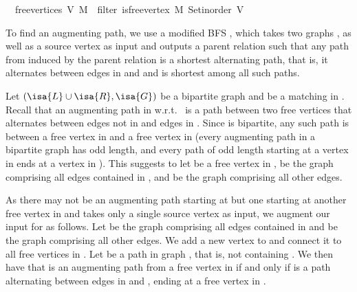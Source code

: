 \begin{isabellebody}
\ \ {\isachardoublequoteopen}free{\isacharunderscore}{\kern0pt}vertices\ V\ M\ {\isasymequiv}\ filter\ {\isacharparenleft}{\kern0pt}is{\isacharunderscore}{\kern0pt}free{\isacharunderscore}{\kern0pt}vertex\ M{\isacharparenright}{\kern0pt}\ {\isacharparenleft}{\kern0pt}Set{\isacharunderscore}{\kern0pt}inorder\ V{\isacharparenright}{\kern0pt}{\isachardoublequoteclose}%
\begin{isamarkuptext}%
To find an augmenting path, we use a modified BFS , which takes two graphs
,  as well as a source vertex  as input and outputs a parent
relation such that any path from  induced by the parent relation is a shortest
alternating path, that is, it alternates between edges in  and  and is shortest
among all such paths.

Let $(\isa{L}\cup \isa{R},\isa{G})$ be a bipartite graph and  be a matching in .
Recall that an augmenting path in  w.r.t.\  is a path between two free vertices
that alternates between edges not in  and edges in . Since  is bipartite,
any such path is between a free vertex in  and a free vertex in  (every augmenting
path in a bipartite graph has odd length, and every path of odd length starting at a vertex in
 ends at a vertex in ). This suggests to let  be a free vertex
 in ,  be the graph comprising all edges contained in ,
and  be the graph comprising all other edges.

As there may not be an augmenting path starting at  but one starting at another free vertex
in  and  takes only a single source vertex as input, we augment our input
for  as follows. Let  be the graph comprising all edges contained in
 and  be the graph comprising all other edges. We add a new vertex  to
 and connect it to all free vertices in . Let  be a path in graph
, that is, not containing . We then have that  is an augmenting path from
a free vertex in  if and only if  is a path alternating between edges in
 and , ending at a free vertex in .


\end{isamarkuptext}
\end{isabellebody}
